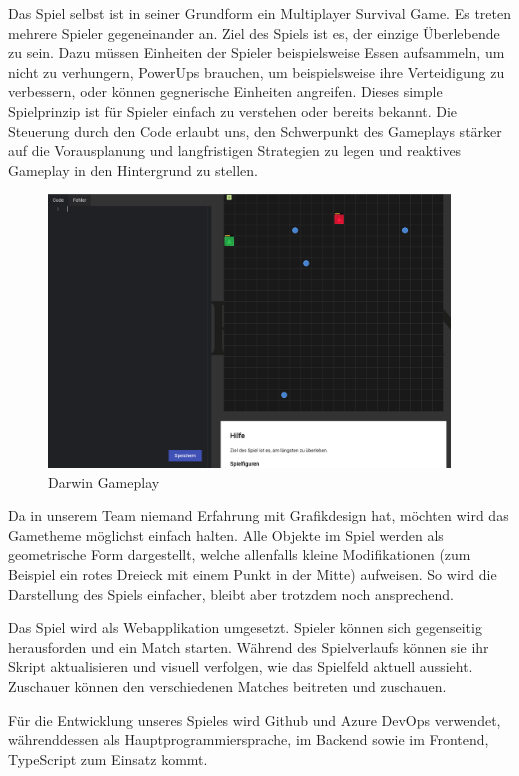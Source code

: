 \documentclass[a4paper, 11pt]{scrartcl}
\begin{document}
Das Spiel selbst ist in seiner Grundform ein Multiplayer Survival Game.
Es treten mehrere Spieler gegeneinander an.
Ziel des Spiels ist es, der einzige Überlebende zu sein.
Dazu müssen Einheiten der Spieler beispielsweise Essen aufsammeln, um nicht zu verhungern, PowerUps brauchen, um beispielsweise ihre Verteidigung zu verbessern, oder können gegnerische Einheiten angreifen.
Dieses simple Spielprinzip ist für Spieler einfach zu verstehen oder bereits bekannt.
Die Steuerung durch den Code erlaubt uns, den Schwerpunkt des Gameplays stärker auf die Vorausplanung und langfristigen Strategien zu legen und reaktives Gameplay in den Hintergrund zu stellen.

\begin{figure}[h]
  \caption{Darwin Gameplay}
  \centering
  \includegraphics[width=0.95\textwidth]{./img/darwin-gameplay}
\end{figure}

Da in unserem Team niemand Erfahrung mit Grafikdesign hat, möchten wird das Gametheme möglichst einfach halten.
Alle Objekte im Spiel werden als geometrische Form dargestellt, welche allenfalls kleine Modifikationen (zum Beispiel ein rotes Dreieck mit einem Punkt in der Mitte) aufweisen.
So wird die Darstellung des Spiels einfacher, bleibt aber trotzdem noch ansprechend.

Das Spiel wird als Webapplikation umgesetzt.
Spieler können sich gegenseitig herausforden und ein Match starten.
Während des Spielverlaufs können sie ihr Skript aktualisieren und visuell verfolgen, wie das Spielfeld aktuell aussieht. Zuschauer können den verschiedenen Matches beitreten und zuschauen.

Für die Entwicklung unseres Spieles wird Github und Azure DevOps verwendet,
währenddessen als Hauptprogrammiersprache, im Backend sowie im Frontend, TypeScript zum Einsatz kommt.
\end{document}
